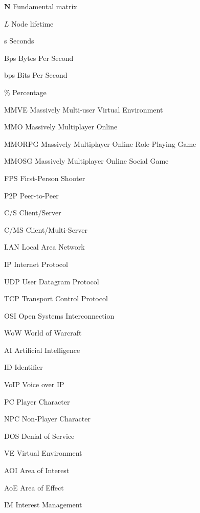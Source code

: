 \begin{Nomencl}[\gnat]
        \item[$\textbf{N}$]             Fundamental matrix
        \item[$L$]                      Node lifetime
        \item[s]        Seconds
        \item[Bps]      Bytes Per Second
        \item[bps]      Bits Per Second
        \item[\%]       Percentage
		\item[MMVE]		Massively Multi-user Virtual Environment
        \item[MMO]		Massively Multiplayer Online
        \item[MMORPG]   Massively Multiplayer Online Role-Playing Game
        \item[MMOSG]    Massively Multiplayer Online Social Game
        \item[FPS]      First-Person Shooter
        \item[P2P]      Peer-to-Peer
        \item[C/S]      Client/Server
        \item[C/MS]     Client/Multi-Server
        \item[LAN]      Local Area Network
        \item[IP]       Internet Protocol
        \item[UDP]      User Datagram Protocol
        \item[TCP]      Transport Control Protocol
        \item[OSI]      Open Systems Interconnection
        \item[WoW]      World of Warcraft
        \item[AI]       Artificial Intelligence
        \item[ID]       Identifier
        \item[VoIP]     Voice over IP
        \item[PC]       Player Character
        \item[NPC]      Non-Player Character
        \item[DOS]      Denial of Service
        \item[VE]       Virtual Environment
        \item[AOI]      Area of Interest
        \item[AoE]      Area of Effect
        \item[IM]       Interest Management

\end{Nomencl}
